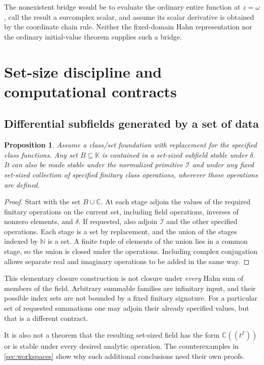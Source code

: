 \documentclass[11pt,letterpaper]{article}
\numberwithin{equation}{section}
\newtheorem{proposition}[theorem]{Proposition}
\theoremstyle{definition}
\theoremstyle{remark}
\newcommand{\K}{\mathbb K}
\newcommand{\C}{\mathbb C}
\newcommand{\N}{\mathbb N}
\newcommand{\Iop}{\mathcal I}
\begin{document}
The nonexistent bridge would be to evaluate the ordinary entire function at $z=\omega$, call the result a surcomplex scalar, and assume its scalar derivative is obtained by the coordinate chain rule. Neither the fixed-domain Hahn representation nor the ordinary initial-value theorem supplies such a bridge.

\section{Set-size discipline and computational contracts}\label{sec:size}

\subsection{Differential subfields generated by a set of data}
\begin{proposition}\label{prop:setclosure}
Assume a class/set foundation with replacement for the specified class functions. Any set $B\subseteq\K$ is contained in a set-sized subfield stable under $\delta$. It can also be made stable under the normalized primitive $\Iop$ and under any fixed set-sized collection of specified finitary class operations, wherever those operations are defined.
\end{proposition}
\begin{proof}
Start with the set $B\cup\C$. At each stage adjoin the values of the required finitary operations on the current set, including field operations, inverses of nonzero elements, and $\delta$. If requested, also adjoin $\Iop$ and the other specified operations. Each stage is a set by replacement, and the union of the stages indexed by $\N$ is a set. A finite tuple of elements of the union lies in a common stage, so the union is closed under the operations. Including complex conjugation allows separate real and imaginary operations to be added in the same way.
\end{proof}
This elementary closure construction is not closure under \emph{every} Hahn sum of members of the field. Arbitrary summable families are infinitary input, and their possible index sets are not bounded by a fixed finitary signature. For a particular set of requested summations one may adjoin their already specified values, but that is a different contract.

It is also not a theorem that the resulting set-sized field has the form $\C((t^\Gamma))$ or is stable under every desired analytic operation. The counterexamples in \cref{sec:workspaces} show why such additional conclusions need their own proofs.
\end{document}
